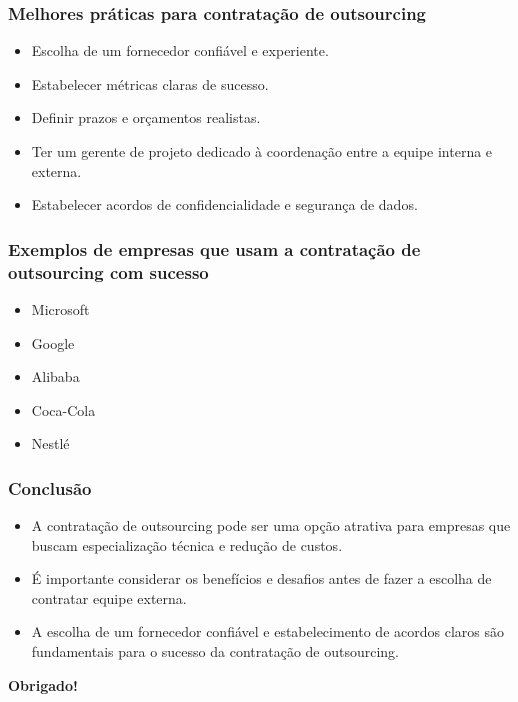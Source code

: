 \documentclass{beamer}
\begin{document}
\begin{frame}

\frametitle{Melhores práticas para contratação de outsourcing}

\begin{itemize}
\item Escolha de um fornecedor confiável e experiente.
\item Estabelecer métricas claras de sucesso.
\item Definir prazos e orçamentos realistas.
\item Ter um gerente de projeto dedicado à coordenação entre a equipe interna e externa.
\item Estabelecer acordos de confidencialidade e segurança de dados.
\end{itemize}

\end{frame}

\begin{frame}

\frametitle{Exemplos de empresas que usam a contratação de outsourcing com sucesso}

\begin{itemize}
\item Microsoft
\item Google
\item Alibaba
\item Coca-Cola
\item Nestlé
\end{itemize}

\end{frame}

\begin{frame}

\frametitle{Conclusão}

\begin{itemize}
\item A contratação de outsourcing pode ser uma opção atrativa para empresas que buscam especialização técnica e redução de custos.
\item É importante considerar os benefícios e desafios antes de fazer a escolha de contratar equipe externa.
\item A escolha de um fornecedor confiável e estabelecimento de acordos claros são fundamentais para o sucesso da contratação de outsourcing.
\end{itemize}

\vspace{1cm}

\centering
\textbf{Obrigado!}

\end{frame}

\backmatter
\end{document}
